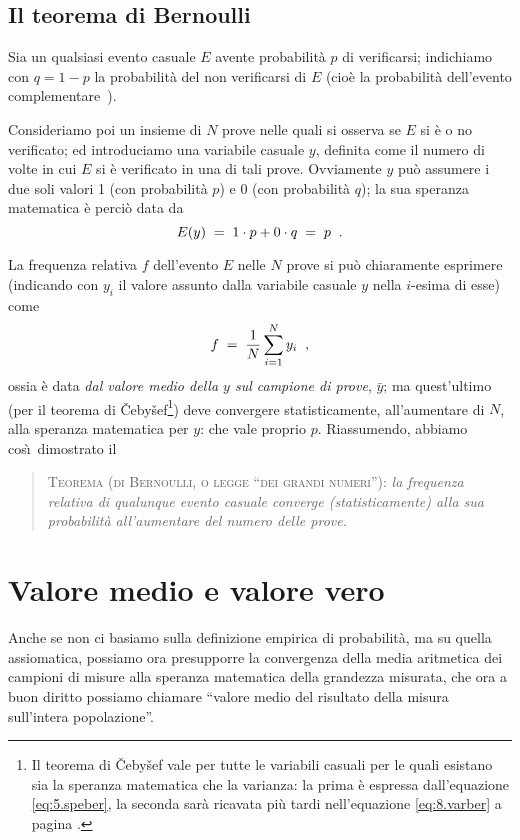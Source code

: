 \subsection{Il teorema di Bernoulli}%
%
\label{ch:5.teober}
Sia un qualsiasi evento casuale $E$ avente probabilit\`a $p$
di verificarsi; indichiamo con $q = 1 - p$ la probabilit\`a
del non verificarsi di $E$ (cio\`e la probabilit\`a
dell'evento complementare \,).

Consideriamo poi un insieme di $N$ prove nelle quali si
osserva se $E$ si \`e o no verificato; ed introduciamo una
variabile casuale $y$, definita come il numero di volte in
cui $E$ si \`e verificato in una di tali prove.  Ovviamente
$y$ pu\`o assumere i due soli valori 1 (con probabilit\`a
$p$) e 0 (con probabilit\`a $q$); la sua speranza matematica
\`e perci\`o data da
\begin{equation}
  E( y ) \; = \; 1 \cdot p + 0 \cdot q \; = \; p \;\;
  \label{eq:5.speber} .
\end{equation}

La frequenza relativa $f$ dell'evento $E$ nelle $N$ prove si
pu\`o chiaramente esprimere (indicando con $y_i$ il valore
assunto dalla variabile casuale $y$ nella $i$-esima di esse)
come
\begin{equation*}
  f \; = \; \frac{1}{N} \sum_{i=1}^N y_i \;\; ,
\end{equation*}
ossia \`e data \emph{dal valore medio della $y$ sul campione
  di prove}, $\bar y$; ma quest'ultimo (per il teorema di \v
Ceby\v sef\footnote{Il teorema di \v Ceby\v sef vale per
  tutte le variabili casuali per le quali esistano sia la
  speranza matematica che la varianza: la prima \`e espressa
  dall'equazione \eqref{eq:5.speber}, la seconda sar\`a
  ricavata pi\`u tardi nell'equazione \eqref{eq:8.varber} a
  pagina \pageref{eq:8.varber}.}) deve convergere
statisticamente, all'aumentare di $N$, alla speranza
matematica per $y$: che vale proprio $p$.  Riassumendo,
abbiamo cos\`\i\ dimostrato il
\begin{quote}
  \textsc{Teorema (di Bernoulli, o legge ``dei grandi
    numeri''):} \textit{la frequenza relativa di qualunque
    evento casuale converge (statisticamente) alla sua
    probabilit\`a all'aumentare del numero delle prove.}
\end{quote}%
%

\section{Valore medio e valore vero}%
Anche se non ci basiamo sulla definizione empirica di
probabilit\`a, ma su quella assiomatica, possiamo ora
presupporre la convergenza della media aritmetica dei
campioni di misure alla speranza matematica della grandezza
misurata, che ora a buon diritto possiamo chiamare ``valore
medio del risultato della misura sull'intera popolazione''.

